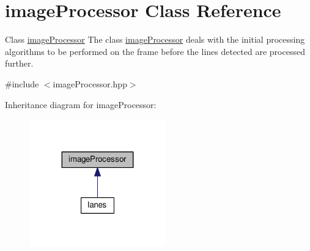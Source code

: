 \hypertarget{classimageProcessor}{}\section{image\+Processor Class Reference}
\label{classimageProcessor}


Class \hyperlink{classimageProcessor}{image\+Processor} The class \hyperlink{classimageProcessor}{image\+Processor} deals with the initial processing algorithms to be performed on the frame before the lines detected are processed further.  




{\ttfamily \#include $<$image\+Processor.\+hpp$>$}



Inheritance diagram for image\+Processor\+:
\nopagebreak
\begin{figure}[H]
\begin{center}
\leavevmode
\includegraphics[width=167pt]{classimageProcessor__inherit__graph}
\end{center}
\end{figure}
